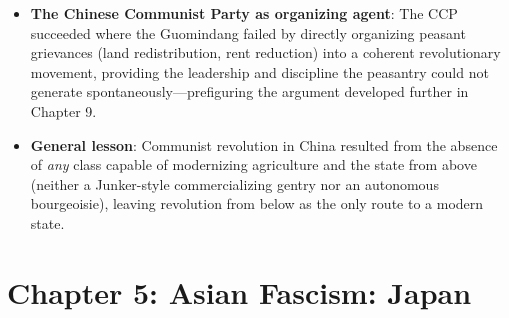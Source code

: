 \documentclass[12pt]{article}
\begin{document}
\begin{itemize}[leftmargin=*, itemsep=4pt]
    \item \textbf{The Chinese Communist Party as organizing agent}: The CCP succeeded where the Guomindang failed by directly organizing peasant grievances (land redistribution, rent reduction) into a coherent revolutionary movement, providing the leadership and discipline the peasantry could not generate spontaneously---prefiguring the argument developed further in Chapter 9.
    \item \textbf{General lesson}: Communist revolution in China resulted from the absence of \emph{any} class capable of modernizing agriculture and the state from above (neither a Junker-style commercializing gentry nor an autonomous bourgeoisie), leaving revolution from below as the only route to a modern state.
\end{itemize}

\section{Chapter 5: Asian Fascism: Japan}
\end{document}
